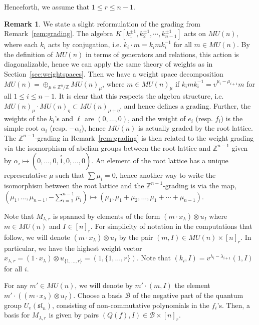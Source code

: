\documentclass{amsart}
\numberwithin{equation}{section}
\theoremstyle{theorem}
\theoremstyle{definition}
\newtheorem{remark}[theorem]{Remark}
\newcommand{\ZZ}{\mathbb{Z}}
\newcommand{\bb}{\mathcal{B}}
\newcommand{\sll}{\mathfrak{sl}}
\newcommand{\uvsln}{U_v(\sll_n)}
\begin{document}
Henceforth, we assume that $1\leq r\leq n-1$.  
\begin{remark}
We state a slight reformulation of the grading from Remark~\ref{rem:grading}.  The algebra $K[k_1^{\pm1}, k_2^{\pm1},\cdots, k_{n-1}^{\pm1}]$ acts on $MU(n)$, where each $k_i$ acts by conjugation, i.e. $k_i\cdot m=k_imk_i^{-1}$ for all $m\in MU(n)$. By the definition of $MU(n)$ in terms of generators and relations, this action is diagonalizable, hence we can apply the same theory of weights as in Section~\ref{sec:weightspaces}. Then we have a weight space decomposition $MU(n)=\oplus_{\mu\in \ZZ^n/\ZZ}MU(n)_\mu$, where $m\in MU(n)_\mu$ if $k_imk_i^{-1} = v^{\mu_{i}-\mu_{i+1}}m$ for all $1\leq i\leq n-1$. It is clear that this respects the algebra structure, i.e. $MU(n)_\mu\cdot MU(n)_\eta\subset MU(n)_{\mu+\eta}$, and hence defines a grading. Further, the weights of the $k_i$'s and $\ell$ are $(0,\ldots,0)$, and the weight of $e_i$ (resp. $f_i$) is the simple root $\alpha_i$ (resp. $-\alpha_i$), hence $MU(n)$ is actually graded by the root lattice. The $\ZZ^{n-1}$-grading in Remark~\ref{rem:grading} is then related to the weight grading via the isomorphism of abelian groups between the root lattice and $\ZZ^{n-1}$ given by $\alpha_i\mapsto (0,\ldots,0,\stackrel{i}{1},0,\ldots,0)$. An element of the root lattice has a unique representative $\mu$ such that $\sum\mu_i=0$, hence another way to write the isomorphism between the root lattice and the $\ZZ^{n-1}$-grading is via the map, $(\mu_1,\ldots,\mu_{n-1},-\sum_{i=1}^{n-1}\mu_i)\mapsto(\mu_1,\mu_1+\mu_2,\ldots, \mu_1+\cdots+\mu_{n-1})$.
\end{remark}


Note that $M_{\lambda,r}$ is spanned by elements of the form $(m\cdot x_{\lambda})\otimes u_I$ where $m\in MU(n)$ and $I\in [n]_r$. For simplicity of notation in the computations that follow, we will denote $(m\cdot x_{\lambda})\otimes u_I$ %
by the pair $(m,I)\in MU(n)\times [n]_r$. In particular, we have the highest weight vector $x_{\lambda,r}=(1\cdot x_{\lambda})\otimes u_{\{1,\ldots,r\}}=(1,\{1,\ldots,r\})$. Note that $(k_i, I) = v^{\lambda_i-\lambda_{i+1}}(1,I)$ for all $i$.

For any $m'\in MU(n)$, we will denote by $m'\cdot (m,I)$ the element $m'\cdot ((m\cdot x_{\lambda})\otimes u_I)$.  Choose a basis $\mathcal B$ of the negative part of the quantum group $\uvsln$, consisting of non-commutative polynomials in the $f_i$'s. Then, a basis for $M_{\lambda,r}$ is given by pairs $(Q(f), I)\in\bb\times  [n]_r$.
\end{document}
